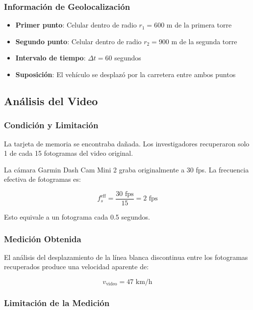\documentclass[12pt]{article}
\begin{document}
\subsubsection*{Información de Geolocalización}

\begin{itemize}
    \item \textbf{Primer punto}: Celular dentro de radio $r_1 = 600$ m de la primera torre
    \item \textbf{Segundo punto}: Celular dentro de radio $r_2 = 900$ m de la segunda torre
    \item \textbf{Intervalo de tiempo}: $\Delta t = 60$ segundos
    \item \textbf{Suposición}: El vehículo se desplazó por la carretera entre ambos puntos
\end{itemize}

\subsection*{Análisis del Video}

\subsubsection*{Condición y Limitación}

La tarjeta de memoria se encontraba dañada. Los investigadores recuperaron solo 1 de cada 15 fotogramas del video original.

La cámara Garmin Dash Cam Mini 2 graba originalmente a 30 fps. La frecuencia efectiva de fotogramas es:

\begin{equation}
f_s^{\text{eff}} = \frac{30 \text{ fps}}{15} = 2 \text{ fps}
\end{equation}

Esto equivale a un fotograma cada 0.5 segundos.

\subsubsection*{Medición Obtenida}

El análisis del desplazamiento de la línea blanca discontinua entre los fotogramas recuperados produce una velocidad aparente de:

\begin{equation}
v_{\text{video}} = 47 \text{ km/h}
\end{equation}

\subsubsection*{Limitación de la Medición}
\end{document}
